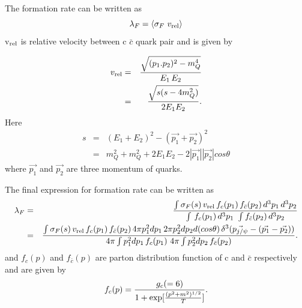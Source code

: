 \documentclass[aps,prc,preprint,superscriptaddress,showpacs,showkeys]{revtex4-1}
\begin{document}
The formation rate can be written as 
\begin{equation}
\lambda_{F} = \langle \sigma_{F} \,\, v_{\rm rel} \rangle
\end{equation}
v$_{\rm rel}$ is relative velocity between c $\bar{c}$ quark pair and is given by

\begin{eqnarray}
v_{\rm rel} &=& {\sqrt{(p_{1}.p_{2})^{2} - m_Q^{4} } \over E_{1} \, E_{2}} \nonumber \\
            &=& \frac{\sqrt{s(s-4m_{Q}^{2})}}{2E_1E_2}.
\end{eqnarray}
Here
\begin{eqnarray}
 s &= &(E_1+E_2)^{2} - (\vec{p_1}+\vec{p_2})^2 \nonumber \\
   &= & m_Q^{2} + m_Q^{2} + 2 E_1E_2 - 2 |\vec{p_1}||\vec{p_2}|cos\theta 
\end{eqnarray}
where $\vec{p_{1}}$ and $\vec{p_{2}}$ are three momentum of quarks. 

The final expression for formation rate can be written as
\begin{eqnarray}
\lambda_{F} &= &\frac{\int \sigma_{F}(s)\, v_{\rm rel}\,f_{c}(p_1)\, f_{\bar{c}} (p_2) \,d^{3}p_1 \,d^{3}p_2} {\int \,f_{c}(p_1)\,d^{3}p_1 \,\, \int f_{\bar{c}} (p_2)\,d^{3}p_2}\\
            &= &\frac{\int \sigma_{F}(s)\, v_{\rm rel}\,f_{c}(p_1)\, f_{\bar{c}} (p_2) \, 4\pi p_1^{2} dp_1 \, 2\pi p_2^{2} dp_2 d(cos \theta)\, \delta^{3}(\vec{p_{j/\psi}}-(\vec{p_1}-\vec{p_2}))}
           {4\pi \int p_1^{2} dp_1 \,f_{c}(p_1) \,\, 4 \pi \int p_2^{2} dp_2 \, f_{\bar{c}} (p_2)}.
\end{eqnarray}
and $f_{c}(p)$ and $f_{\bar{c}}(p)$ are parton distribution function of c and $\bar{c}$ respectively and are given by
\begin{equation}
f_{c}(p)={g_c(=6)  \over 1 + {\rm exp} [ { (p^{2} + m^{2} )^{1/2}  \over T }] }.
\end{equation}


\end{document}
